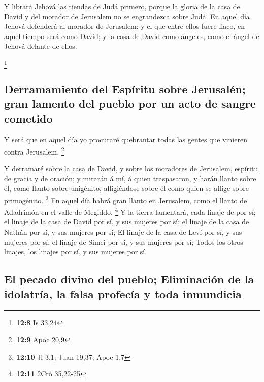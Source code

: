  Y librará Jehová las tiendas de Judá primero, porque la
gloria de la casa de David y del morador de Jerusalem no se engrandezca
sobre Judá.  En aquel día Jehová defenderá al morador de
Jerusalem: y el que entre ellos fuere flaco, en aquel tiempo será como
David; y la casa de David como ángeles, como el ángel de Jehová delante
de ellos.

\footnote{\textbf{12:8} Is 33,24}

\hypertarget{derramamiento-del-espuxedritu-sobre-jerusaluxe9n-gran-lamento-del-pueblo-por-un-acto-de-sangre-cometido}{%
\subsection{Derramamiento del Espíritu sobre Jerusalén; gran lamento del
pueblo por un acto de sangre
cometido}\label{derramamiento-del-espuxedritu-sobre-jerusaluxe9n-gran-lamento-del-pueblo-por-un-acto-de-sangre-cometido}}

 Y será que en aquel día yo procuraré quebrantar todas las
gentes que vinieren contra Jerusalem. \footnote{\textbf{12:9} Apoc 20,9}

 Y derramaré sobre la casa de David, y sobre los
moradores de Jerusalem, espíritu de gracia y de oración; y mirarán á mí,
á quien traspasaron, y harán llanto sobre él, como llanto sobre
unigénito, afligiéndose sobre él como quien se aflige sobre primogénito.
\footnote{\textbf{12:10} Jl 3,1; Juan 19,37; Apoc 1,7} 
En aquel día habrá gran llanto en Jerusalem, como el llanto de Adadrimón
en el valle de Megiddo. \footnote{\textbf{12:11} 2Cró 35,22-25}
 Y la tierra lamentará, cada linaje de por sí; el linaje
de la casa de David por sí, y sus mujeres por sí; el linaje de la casa
de Nathán por sí, y sus mujeres por sí;  El linaje de la
casa de Leví por sí, y sus mujeres por sí; el linaje de Simei por sí, y
sus mujeres por sí;  Todos los otros linajes, los linajes
por sí, y sus mujeres por sí.

\hypertarget{el-pecado-divino-del-pueblo-eliminaciuxf3n-de-la-idolatruxeda-la-falsa-profecuxeda-y-toda-inmundicia}{%
\subsection{El pecado divino del pueblo; Eliminación de la idolatría, la
falsa profecía y toda
inmundicia}\label{el-pecado-divino-del-pueblo-eliminaciuxf3n-de-la-idolatruxeda-la-falsa-profecuxeda-y-toda-inmundicia}}

